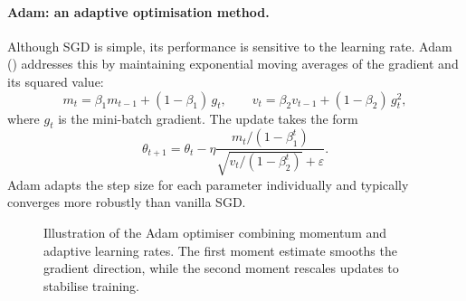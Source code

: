 \documentclass[12pt,a4paper]{article}
\theoremstyle{definition}
\theoremstyle{plain}
\theoremstyle{remark}
\theoremstyle{plain}
\begin{document}
\paragraph{Adam: an adaptive optimisation method.}
Although SGD is simple, its performance is sensitive to the learning rate.  
Adam (\cite{KingmaBa2015Adam}) addresses this by maintaining exponential moving averages of the gradient and its squared value:
\[
m_{t} = \beta_1 m_{t-1} + (1-\beta_1)\, g_t,
\qquad
v_{t} = \beta_2 v_{t-1} + (1-\beta_2)\, g_t^{2},
\]
where $g_t$ is the mini-batch gradient. 
The update takes the form
\[
\theta_{t+1}
=
\theta_t 
- \eta \frac{m_t/(1-\beta_1^{t})}{\sqrt{v_t/(1-\beta_2^{t})}+\varepsilon}.
\]
Adam adapts the step size for each parameter individually and typically converges more robustly than vanilla SGD.
\begin{figure}[h!]
\centering
{}
\caption{Illustration of the Adam optimiser combining momentum and adaptive learning rates. 
The first moment estimate smooths the gradient direction, while the second moment rescales updates to stabilise training.}
\label{fig:adam_optimizer}
\end{figure}
\FloatBarrier
\end{document}
